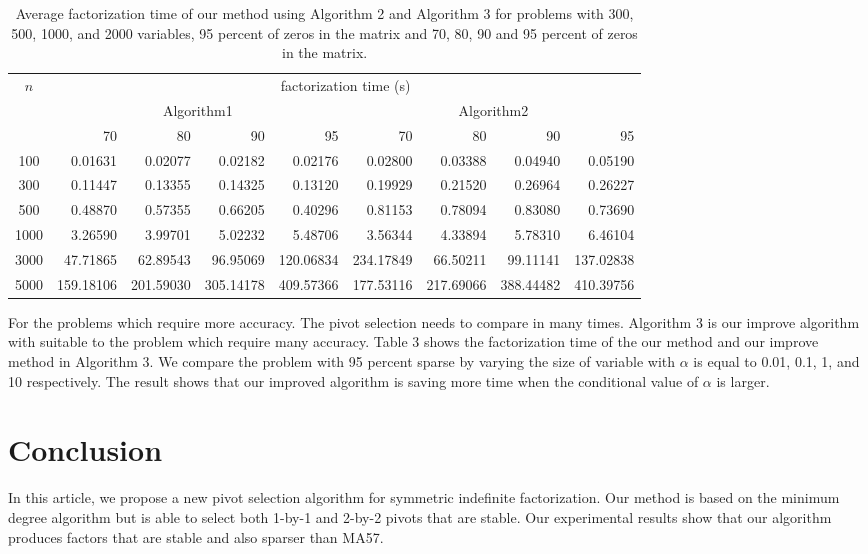 \documentclass{article}
\begin{document}
\ifx
\begin{table}
\caption{Average factorization time of our method using Algorithm 2 and Algorithm 3 for problems with 300, 500, 1000, and 2000 variables, 95 percent of zeros in the matrix and 70, 80, 90 and 95 percent of zeros in the matrix.}
\begin{tabular}{|c|r|r|r|r|r|r|r|r|}
\hline
\multirow{3}{*}{$n$} 
&\multicolumn{8}{c|}{factorization time (s)}\\
\cline{2-9}
&\multicolumn{4}{c|}{Algorithm1}
&\multicolumn{4}{c|}{Algorithm2}\\
\cline{2-9}
&70
&80
&90
&95
&70
&80
&90
&95\\
\hline
100	&	0.01631	&	0.02077	&	0.02182	&	0.02176	&	0.02800	&	0.03388	&	0.04940	&	0.05190	\\													
300	&	0.11447	&	0.13355	&	0.14325	&	0.13120	&	0.19929	&	0.21520	&	0.26964	&	0.26227	\\													
500	&	0.48870	&	0.57355	&	0.66205	&	0.40296	&	0.81153	&	0.78094	&	0.83080	&	0.73690	\\													
1000	&	3.26590	&	3.99701	&	5.02232	&	5.48706	&	3.56344	&	4.33894	&	5.78310	&	6.46104	\\													
3000	&	47.71865	&	62.89543	&	96.95069	&	120.06834	&	234.17849	&	66.50211	&	99.11141	&	137.02838	\\													
5000	&	159.18106	&	201.59030	&	305.14178	&	409.57366	&	177.53116	&	217.69066	&	388.44482	&	410.39756	\\													\hline
\end{tabular}
\end{table}
\fi
\ifx
For the problems which require more accuracy. The pivot selection needs to compare in many times. 
Algorithm 3 is our improve algorithm with suitable to the problem which require many accuracy. 
Table 3 shows the factorization time of the our method and our improve method in Algorithm 3.
We compare the problem with 95 percent sparse by varying the size of variable with $\alpha$ is equal to 0.01, 0.1, 1, and 10 respectively. 
The result shows that our improved algorithm is saving more time when the conditional value of $\alpha$ is larger. 
\fi

\section{Conclusion} \label{sec6}

In this article, we propose a new pivot selection algorithm for symmetric indefinite factorization. Our method is based on the minimum degree algorithm but is able to select both 1-by-1 and 2-by-2 pivots that are stable. Our experimental results show that our algorithm produces factors that are stable and also sparser than MA57.


\end{document}
